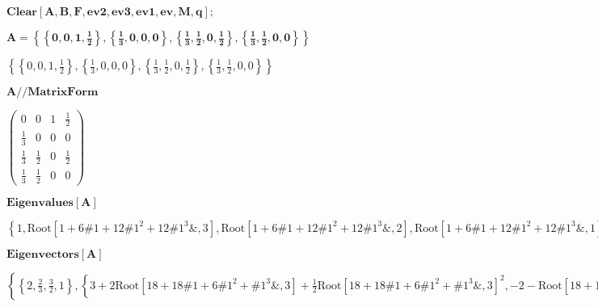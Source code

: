 \documentclass{article}
\begin{document}
\noindent\(\pmb{\text{Clear}[A,B,F,\text{ev2},\text{ev3},\text{ev1},\text{ev},M,q];}\)

\noindent\(\pmb{A=\left\{\left\{0,0,1,\frac{1}{2}\right\},\left\{\frac{1}{3},0,0,0\right\},\left\{\frac{1}{3},\frac{1}{2},0,\frac{1}{2}\right\},\left\{\frac{1}{3},\frac{1}{2},0,0\right\}\right\}}\)

\noindent\(\left\{\left\{0,0,1,\frac{1}{2}\right\},\left\{\frac{1}{3},0,0,0\right\},\left\{\frac{1}{3},\frac{1}{2},0,\frac{1}{2}\right\},\left\{\frac{1}{3},\frac{1}{2},0,0\right\}\right\}\)

\noindent\(\pmb{A\text{//}\text{MatrixForm}}\)

\noindent\(\left(
\begin{array}{cccc}
 0 & 0 & 1 & \frac{1}{2} \\
 \frac{1}{3} & 0 & 0 & 0 \\
 \frac{1}{3} & \frac{1}{2} & 0 & \frac{1}{2} \\
 \frac{1}{3} & \frac{1}{2} & 0 & 0
\end{array}
\right)\)

\noindent\(\pmb{\text{Eigenvalues}[A]}\)

\noindent\(\left\{1,\text{Root}\left[1+6 \text{$\#$1}+12 \text{$\#$1}^2+12 \text{$\#$1}^3\&,3\right],\text{Root}\left[1+6 \text{$\#$1}+12 \text{$\#$1}^2+12
\text{$\#$1}^3\&,2\right],\text{Root}\left[1+6 \text{$\#$1}+12 \text{$\#$1}^2+12 \text{$\#$1}^3\&,1\right]\right\}\)

\noindent\(\pmb{\text{Eigenvectors}[A]}\)

\noindent\(\left\{\left\{2,\frac{2}{3},\frac{3}{2},1\right\},\left\{3+2 \text{Root}\left[18+18 \text{$\#$1}+6 \text{$\#$1}^2+\text{$\#$1}^3\&,3\right]+\frac{1}{2}
\text{Root}\left[18+18 \text{$\#$1}+6 \text{$\#$1}^2+\text{$\#$1}^3\&,3\right]^2,-2-\text{Root}\left[18+18 \text{$\#$1}+6 \text{$\#$1}^2+\text{$\#$1}^3\&,3\right]-\frac{1}{3}
\text{Root}\left[18+18 \text{$\#$1}+6 \text{$\#$1}^2+\text{$\#$1}^3\&,3\right]^2,-2-\text{Root}\left[18+18 \text{$\#$1}+6 \text{$\#$1}^2+\text{$\#$1}^3\&,3\right]-\frac{1}{6}
\text{Root}\left[18+18 \text{$\#$1}+6 \text{$\#$1}^2+\text{$\#$1}^3\&,3\right]^2,1\right\},\left\{3+2 \text{Root}\left[18+18 \text{$\#$1}+6 \text{$\#$1}^2+\text{$\#$1}^3\&,2\right]+\frac{1}{2}
\text{Root}\left[18+18 \text{$\#$1}+6 \text{$\#$1}^2+\text{$\#$1}^3\&,2\right]^2,-2-\text{Root}\left[18+18 \text{$\#$1}+6 \text{$\#$1}^2+\text{$\#$1}^3\&,2\right]-\frac{1}{3}
\text{Root}\left[18+18 \text{$\#$1}+6 \text{$\#$1}^2+\text{$\#$1}^3\&,2\right]^2,-2-\text{Root}\left[18+18 \text{$\#$1}+6 \text{$\#$1}^2+\text{$\#$1}^3\&,2\right]-\frac{1}{6}
\text{Root}\left[18+18 \text{$\#$1}+6 \text{$\#$1}^2+\text{$\#$1}^3\&,2\right]^2,1\right\},\left\{3+2 \text{Root}\left[18+18 \text{$\#$1}+6 \text{$\#$1}^2+\text{$\#$1}^3\&,1\right]+\frac{1}{2}
\text{Root}\left[18+18 \text{$\#$1}+6 \text{$\#$1}^2+\text{$\#$1}^3\&,1\right]^2,-2-\text{Root}\left[18+18 \text{$\#$1}+6 \text{$\#$1}^2+\text{$\#$1}^3\&,1\right]-\frac{1}{3}
\text{Root}\left[18+18 \text{$\#$1}+6 \text{$\#$1}^2+\text{$\#$1}^3\&,1\right]^2,-2-\text{Root}\left[18+18 \text{$\#$1}+6 \text{$\#$1}^2+\text{$\#$1}^3\&,1\right]-\frac{1}{6}
\text{Root}\left[18+18 \text{$\#$1}+6 \text{$\#$1}^2+\text{$\#$1}^3\&,1\right]^2,1\right\}\right\}\)
\end{document}
